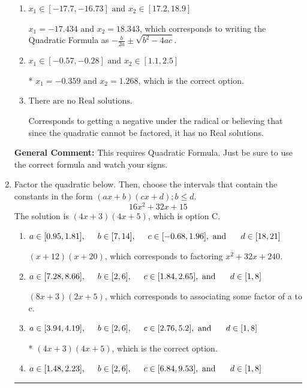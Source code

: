 \documentclass{extbook}[14pt]
\newcommand{\litem}[1]{\item #1

\rule{\textwidth}{0.4pt}}
\begin{document}
\begin{enumerate}
{\begin{enumerate}[label=\Alph*.]
 $x_1 = -13.944 \text{ and } x_2 = 3.944$, which corresponds to using the Quadratic Formula with $a=1$
\item \( x_1 \in [-17.7, -16.73] \text{ and } x_2 \in [17.2, 18.9] \)

 $x_1 = -17.434 \text{ and } x_2 = 18.343$, which corresponds to writing the Quadratic Formula as $-\frac{b}{2a} \pm \sqrt{b^2 - 4ac}$.
\item \( x_1 \in [-0.57, -0.28] \text{ and } x_2 \in [1.1, 2.5] \)

* $x_1 = -0.359 \text{ and } x_2 = 1.268$, which is the correct option.
\item \( \text{There are no Real solutions.} \)

Corresponds to getting a negative under the radical or believing that since the quadratic cannot be factored, it has no Real solutions.
\end{enumerate}

\textbf{General Comment:} This requires Quadratic Formula. Just be sure to use the correct formula and watch your signs.
}
\litem{
Factor the quadratic below. Then, choose the intervals that contain the constants in the form $(ax+b)(cx+d); b \leq d.$
\[ 16x^{2} +32 x + 15 \]
The solution is \( (4x + 3)(4x + 5) \), which is option C.\begin{enumerate}[label=\Alph*.]
\item \( a \in [0.95, 1.81], \hspace*{5mm} b \in [7, 14], \hspace*{5mm} c \in [-0.68, 1.96], \text{ and } \hspace*{5mm} d \in [18, 21] \)

 $(x + 12)(x + 20)$, which corresponds to factoring $x^{2} +32 x + 240$.
\item \( a \in [7.28, 8.66], \hspace*{5mm} b \in [2, 6], \hspace*{5mm} c \in [1.84, 2.65], \text{ and } \hspace*{5mm} d \in [1, 8] \)

 $(8x + 3)(2x + 5)$, which corresponds to associating some factor of a to c.
\item \( a \in [3.94, 4.19], \hspace*{5mm} b \in [2, 6], \hspace*{5mm} c \in [2.76, 5.2], \text{ and } \hspace*{5mm} d \in [1, 8] \)

* $(4x + 3)(4x + 5)$, which is the correct option.
\item \( a \in [1.48, 2.23], \hspace*{5mm} b \in [2, 6], \hspace*{5mm} c \in [6.84, 9.53], \text{ and } \hspace*{5mm} d \in [1, 8] \)


\end{enumerate}}
\end{enumerate}
\end{document}
